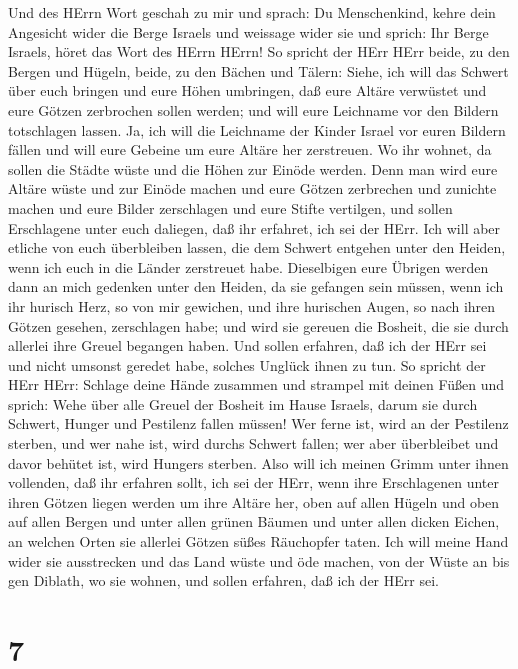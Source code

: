  Und des HErrn Wort geschah zu mir und sprach: 
Du Menschenkind, kehre dein Angesicht wider die Berge Israels und
weissage wider sie  und sprich: Ihr Berge Israels, höret das
Wort des HErrn HErrn! So spricht der HErr HErr beide, zu den Bergen und
Hügeln, beide, zu den Bächen und Tälern: Siehe, ich will das Schwert
über euch bringen und eure Höhen umbringen,  daß eure Altäre
verwüstet und eure Götzen zerbrochen sollen werden; und will eure
Leichname vor den Bildern totschlagen lassen.  Ja, ich will
die Leichname der Kinder Israel vor euren Bildern fällen und will eure
Gebeine um eure Altäre her zerstreuen.  Wo ihr wohnet, da
sollen die Städte wüste und die Höhen zur Einöde werden. Denn man wird
eure Altäre wüste und zur Einöde machen und eure Götzen zerbrechen und
zunichte machen und eure Bilder zerschlagen und eure Stifte vertilgen,
 und sollen Erschlagene unter euch daliegen, daß ihr
erfahret, ich sei der HErr.  Ich will aber etliche von euch
überbleiben lassen, die dem Schwert entgehen unter den Heiden, wenn ich
euch in die Länder zerstreuet habe.  Dieselbigen eure
Übrigen werden dann an mich gedenken unter den Heiden, da sie gefangen
sein müssen, wenn ich ihr hurisch Herz, so von mir gewichen, und ihre
hurischen Augen, so nach ihren Götzen gesehen, zerschlagen habe; und
wird sie gereuen die Bosheit, die sie durch allerlei ihre Greuel
begangen haben.  Und sollen erfahren, daß ich der HErr sei
und nicht umsonst geredet habe, solches Unglück ihnen zu tun.
 So spricht der HErr HErr: Schlage deine Hände zusammen und
strampel mit deinen Füßen und sprich: Wehe über alle Greuel der Bosheit
im Hause Israels, darum sie durch Schwert, Hunger und Pestilenz fallen
müssen!  Wer ferne ist, wird an der Pestilenz sterben, und
wer nahe ist, wird durchs Schwert fallen; wer aber überbleibet und davor
behütet ist, wird Hungers sterben. Also will ich meinen Grimm unter
ihnen vollenden,  daß ihr erfahren sollt, ich sei der HErr,
wenn ihre Erschlagenen unter ihren Götzen liegen werden um ihre Altäre
her, oben auf allen Hügeln und oben auf allen Bergen und unter allen
grünen Bäumen und unter allen dicken Eichen, an welchen Orten sie
allerlei Götzen süßes Räuchopfer taten.  Ich will meine
Hand wider sie ausstrecken und das Land wüste und öde machen, von der
Wüste an bis gen Diblath, wo sie wohnen, und sollen erfahren, daß ich
der HErr sei.

\hypertarget{section-6}{%
\section{7}\label{section-6}}

